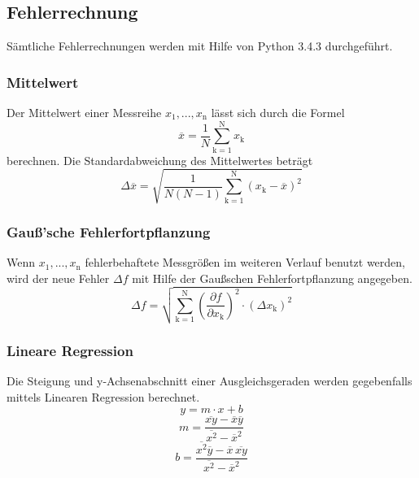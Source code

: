 \subsection{Fehlerrechnung}
Sämtliche Fehlerrechnungen werden mit Hilfe von Python 3.4.3 durchgeführt.
\subsubsection{Mittelwert}
Der Mittelwert einer Messreihe $x_\text{1}, ... ,x_\text{n}$ lässt sich durch die Formel
\begin{equation}
	\overline{x} = \frac{1}{N} \sum_{\text{k}=1}^\text{N} x_\text{k}
	\label{eqn:ave}
\end{equation}
berechnen. Die Standardabweichung des Mittelwertes beträgt
\begin{equation}
	\Delta \overline{x} = \sqrt{ \frac{1}{N(N-1)} \sum_{\text{k}=1}^\text{N} (x_\text{k} - \overline{x})^2}
	\label{eqn:std}
\end{equation}

\subsubsection{Gauß'sche Fehlerfortpflanzung}
Wenn $x_\text{1}, ..., x_\text{n}$ fehlerbehaftete Messgrößen im weiteren Verlauf benutzt werden, wird der neue Fehler $\Delta f$ mit Hilfe der Gaußschen Fehlerfortpflanzung angegeben.
\begin{equation}
	\Delta f = \sqrt{\sum_{\text{k}=1}^\text{N} \left( \frac{ \partial f}{\partial x_\text{k}} \right) ^2 \cdot (\Delta x_\text{k})^2}
	\label{eqn:var}
\end{equation}

\subsubsection{Lineare Regression}
Die Steigung und y-Achsenabschnitt einer Ausgleichsgeraden werden gegebenfalls mittels Linearen Regression berechnet.
\begin{equation}
	y = m \cdot x + b
	\label{eqn:reg}
\end{equation}
\begin{equation}
	m = \frac{ \overline{xy} - \overline{x} \overline{y} } {\overline{x^2} - \overline{x}^2}
	\label{eqn:reg_m}
\end{equation}
\begin{equation}
	b = \frac{ \overline{x^2}\overline{y} - \overline{x} \, \overline{xy}} { \overline{x^2} - \overline{x}^2}
	\label{eqn:reg_b}
\end{equation}
\newpage
